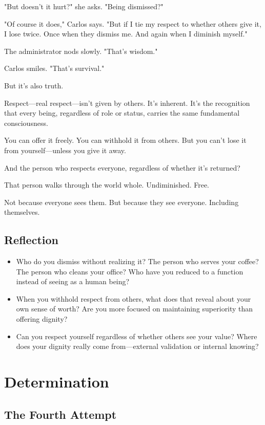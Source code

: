 \documentclass[11pt,twoside]{book}
\begin{document}
"But doesn't it hurt?" she asks. "Being dismissed?"

"Of course it does," Carlos says. "But if I tie my respect to whether others give it, I lose twice. Once when they dismiss me. And again when I diminish myself."

The administrator nods slowly. "That's wisdom."

Carlos smiles. "That's survival."

But it's also truth.

Respect—real respect—isn't given by others. It's inherent. It's the recognition that every being, regardless of role or status, carries the same fundamental consciousness.

You can offer it freely. You can withhold it from others. But you can't lose it from yourself—unless you give it away.

And the person who respects everyone, regardless of whether it's returned?

That person walks through the world whole. Undiminished. Free.

Not because everyone sees them. But because they see everyone. Including themselves.

\section*{Reflection}

\begin{itemize}
\item Who do you dismiss without realizing it? The person who serves your coffee? The person who cleans your office? Who have you reduced to a function instead of seeing as a human being?
\item When you withhold respect from others, what does that reveal about your own sense of worth? Are you more focused on maintaining superiority than offering dignity?
\item Can you respect yourself regardless of whether others see your value? Where does your dignity really come from—external validation or internal knowing?
\end{itemize}

\chapter{Determination}

\section*{The Fourth Attempt}
\end{document}
